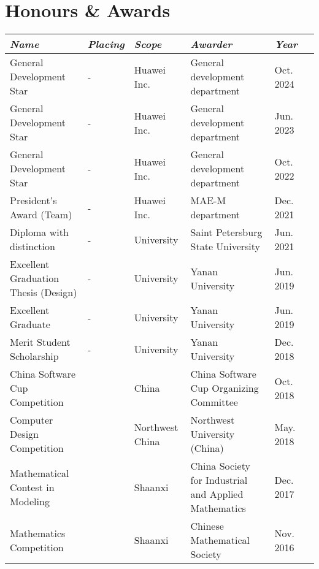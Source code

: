 \documentclass[letterpaper,10pt]{article}
\newcommand{\awardsTable}[1]{
	\begin{tabularx}{\textwidth}{llllll}
	\emph{Name}	& \emph{Placing}	& \emph{Scope}	& \emph{Awarder} & \emph{Year}       \\
	\midrule\midrule
	#1
	\end{tabularx}
}
\newcommand{\awardsTableRow}[6]{
	\BeginAccSupp{method=plain, ActualText=11\string\t 21}#1 & #2 & #3 & #4 & #5\EndAccSupp{} \\
}
\begin{document}
\section{Honours \& Awards}
\setlength{\tabcolsep}{6.0pt}
\renewcommand{\arraystretch}{1.1}
\fontsize{8.5}{11}\selectfont
\awardsTable{
  \awardsTableRow{General Development Star}{-}{Huawei Inc.}{General development
                  department}{Oct. 2024} \\
  \awardsTableRow{General Development Star}{-}{Huawei Inc.}{General development
                  department}{Jun. 2023} \\
  \awardsTableRow{General Development Star}{-}{Huawei Inc.}{General development
                  department}{Oct. 2022} \\
  \awardsTableRow{President's Award (Team)}{-}{Huawei Inc.}{MAE-M
                  department}{Dec. 2021} \\
  \awardsTableRow{Diploma with distinction}{-}{University}{Saint Petersburg
                  State University}{Jun. 2021} \\
  \awardsTableRow{Excellent Graduation Thesis (Design)}{-}{University}{Yanan
                  University}{Jun. 2019} \\
  \awardsTableRow{Excellent Graduate}{-}{University}{Yanan University}{Jun.
                  2019} \\
  \awardsTableRow{Merit Student Scholarship}{-}{University}{Yanan
                  University}{Dec. 2018} \\
  \awardsTableRow{China Software Cup Competition}{\nth{3}}{China}{China
                  Software Cup Organizing Committee}{Oct. 2018} \\
  \awardsTableRow{Computer Design Competition}{\nth{3}}{Northwest
                  China}{Northwest University (China)}{May. 2018} \\
  \awardsTableRow{Mathematical Contest in Modeling}{\nth{2}}{Shaanxi}{China
                  Society for Industrial and Applied Mathematics}{Dec. 2017} \\
  \awardsTableRow{Mathematics Competition}{\nth{3}}{Shaanxi}{Chinese
                  Mathematical Society}{Nov. 2016} \\ \hline }
\end{document}
